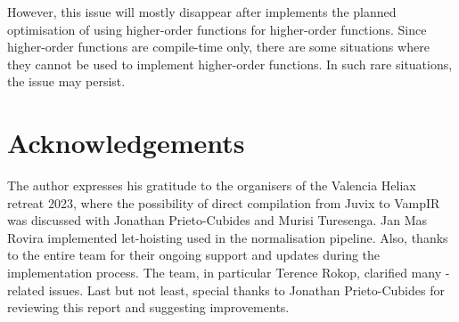 \documentclass[final]{msc}
\begin{document}
However, this issue will mostly disappear after \Geb{} implements the
planned optimisation of using higher-order \VampIR{} functions for \Geb{} higher-order functions. Since \VampIR{} higher-order functions are compile-time only, there are some situations where they cannot be used to implement \Geb{} higher-order functions. In such rare situations, the issue may persist.

\section*{Acknowledgements}

The author expresses his gratitude to the organisers of the Valencia Heliax
retreat 2023, where the possibility of direct compilation from Juvix to VampIR was discussed with Jonathan Prieto-Cubides and Murisi Turesenga. Jan Mas Rovira implemented let-hoisting used in the normalisation pipeline. Also, thanks to the entire \VampIR{} team for their ongoing support and updates during the implementation process. The \Geb{} team, in particular Terence Rokop, clarified many \Geb{}-related issues. Last but not least, special thanks to Jonathan Prieto-Cubides for reviewing this report and suggesting improvements.

\nocite{*}

\end{document}
